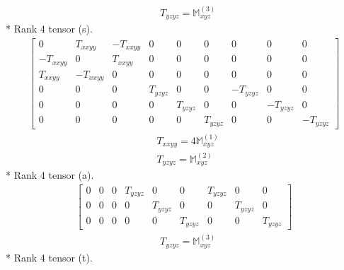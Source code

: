 \documentclass[fleqn,8pt,landscape]{jsarticle}
\begin{document}
\begin{align*}
& T_{yzyz} = \mathbb{M}_{xyz}^{(3)}
\end{align*}
* Rank 4 tensor (s).
\begin{align*}
\begin{bmatrix} 0 & T_{xxyy} & - T_{xxyy} & 0 & 0 & 0 & 0 & 0 & 0 \\ - T_{xxyy} & 0 & T_{xxyy} & 0 & 0 & 0 & 0 & 0 & 0 \\ T_{xxyy} & - T_{xxyy} & 0 & 0 & 0 & 0 & 0 & 0 & 0 \\ 0 & 0 & 0 & T_{yzyz} & 0 & 0 & - T_{yzyz} & 0 & 0 \\ 0 & 0 & 0 & 0 & T_{yzyz} & 0 & 0 & - T_{yzyz} & 0 \\ 0 & 0 & 0 & 0 & 0 & T_{yzyz} & 0 & 0 & - T_{yzyz} \end{bmatrix}
\end{align*}
\begin{align*}
& T_{xxyy} = 4 \mathbb{M}_{xyz}^{(1)} \\
& T_{yzyz} = \mathbb{M}_{xyz}^{(2)}
\end{align*}
* Rank 4 tensor (a).
\begin{align*}
\begin{bmatrix} 0 & 0 & 0 & T_{yzyz} & 0 & 0 & T_{yzyz} & 0 & 0 \\ 0 & 0 & 0 & 0 & T_{yzyz} & 0 & 0 & T_{yzyz} & 0 \\ 0 & 0 & 0 & 0 & 0 & T_{yzyz} & 0 & 0 & T_{yzyz} \end{bmatrix}
\end{align*}
\begin{align*}
& T_{yzyz} = \mathbb{M}_{xyz}^{(3)}
\end{align*}
* Rank 4 tensor (t).
\end{document}
